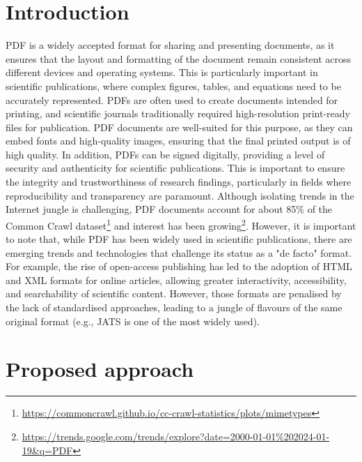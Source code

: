 \section{Introduction}

PDF is a widely accepted format for sharing and presenting documents, as it ensures that the layout and formatting of the document remain consistent across different devices and operating systems. This is particularly important in scientific publications, where complex figures, tables, and equations need to be accurately represented.
PDFs are often used to create documents intended for printing, and scientific journals traditionally required high-resolution print-ready files for publication. PDF documents are well-suited for this purpose, as they can embed fonts and high-quality images, ensuring that the final printed output is of high quality.
In addition, PDFs can be signed digitally, providing a level of security and authenticity for scientific publications. This is important to ensure the integrity and trustworthiness of research findings, particularly in fields where reproducibility and transparency are paramount.
Although isolating trends in the Internet jungle is challenging, PDF documents account for about 85\% of the Common Crawl dataset\footnote{\url{https://commoncrawl.github.io/cc-crawl-statistics/plots/mimetypes}} and interest has been growing\footnote{\url{https://trends.google.com/trends/explore?date=2000-01-01\%202024-01-19&q=PDF}}. 
However, it is important to note that, while PDF has been widely used in scientific publications, there are emerging trends and technologies that challenge its status as a "de facto" format. For example, the rise of open-access publishing has led to the adoption of HTML and XML formats for online articles, allowing greater interactivity, accessibility, and searchability of scientific content.
However, those formats are penalised by the lack of standardised approaches, leading to a jungle of flavours of the same original format (e.g., JATS is one of the most widely used).

\section{Proposed approach}

